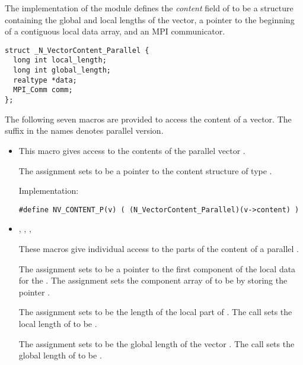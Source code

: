 %
The {\nvecp} implementation of the {\nvector} module defines the {\em content} 
field of  to be a structure containing the global and local lengths 
of the vector, a pointer to the beginning of a contiguous local data array, and
an MPI communicator.
\begin{verbatim} 
struct _N_VectorContent_Parallel {
  long int local_length;
  long int global_length;
  realtype *data;
  MPI_Comm comm;
};
\end{verbatim}
The following seven macros are provided to access the content of a {\nvecp}
vector. The suffix  in the names denotes parallel version.
\begin{itemize}

\item 

  This macro gives access to the contents of the parallel
  vector .
  
  The assignment  sets       
   to be a pointer to the  content    
  structure of type .
  
  Implementation:
  
  \verb|#define NV_CONTENT_P(v) ( (N_VectorContent_Parallel)(v->content) )|
  
\item 
  , , 
  , 
  
  These macros give individual access to the parts of    
  the content of a parallel .                        
  
  The assignment  sets  to be     
  a pointer to the first component of the local data for the  . 
  The assignment  sets the component array of 
   to be  by storing the pointer .                   
  
  The assignment  sets  to be     
  the length of the local part of . 
  The call  sets      
  the local length of  to be .
  
  The assignment  sets  to  
  be the global length of the vector .                    
  The call  sets the global       
  length of  to be .
  

\end{itemize}
